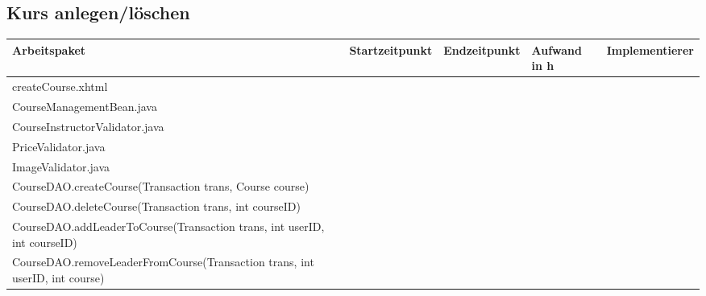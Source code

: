 \begin{landscape}
	
	
	\subsection{Kurs anlegen/löschen}
	\begin{tabular}{|p{10cm}|p{4cm}|p{3cm}|p{3cm}|p{3cm}|}
		\hline  \textbf{Arbeitspaket} & \textbf{Startzeitpunkt} & \textbf{Endzeitpunkt} & \textbf{Aufwand in h} & \textbf{Implementierer} \\ 
		\hline   createCourse.xhtml                                    &                            &                             &                     &\\
		\hline   CourseManagementBean.java                             &                            &                             &                     &\\
		\hline   CourseInstructorValidator.java                        &                            &                             &                     &\\
		\hline   PriceValidator.java                             &                            &                             &                     &\\
		\hline   ImageValidator.java                             &                            &                             &                     &\\
		\hline   CourseDAO.createCourse(Transaction trans, Course course)    &                            &                             &                     &\\
		\hline   CourseDAO.deleteCourse(Transaction trans, int courseID)     &                            &                             &                     &\\
		\hline   CourseDAO.addLeaderToCourse(Transaction trans, int userID, int courseID)    &                            &                             &                     &\\
		\hline   CourseDAO.removeLeaderFromCourse(Transaction trans, int userID, int course) &                            &                             &                     &\\
		\hline 
	\end{tabular} \ \\
	\ \\
	

\end{landscape}
